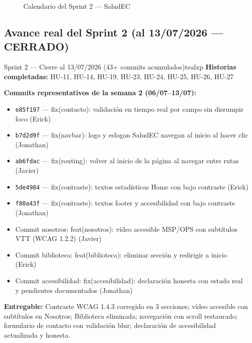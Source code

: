 \documentclass[12pt, a4paper]{article}
\begin{document}
\begin{figure}[H]
\caption{Calendario del Sprint 2 --- SaludEC}
\end{figure}

\subsection{Avance real del Sprint 2 (al 13/07/2026 --- CERRADO)}

\begin{iterbox}{Sprint 2 --- Cierre al 13/07/2026 (43+ commits acumulados)}{tealxp}
\textbf{Historias completadas:} HU-11, HU-14, HU-19, HU-23, HU-24, HU-25, HU-26, HU-27

\textbf{Commits representativos de la semana 2 (06/07--13/07):}
\begin{itemize}
  \item \texttt{e85f197} --- fix(contacto): validación en tiempo real por campo sin disrumpir foco (Erick)
  \item \texttt{b7d2d9f} --- fix(navbar): logo y eslogan SaludEC navegan al inicio al hacer clic (Jonathan)
  \item \texttt{ab6fdac} --- fix(routing): volver al inicio de la página al navegar entre rutas (Javier)
  \item \texttt{5de4984} --- fix(contraste): textos estadísticas Home con bajo contraste (Erick)
  \item \texttt{f80a43f} --- fix(contraste): textos footer y accesibilidad con bajo contraste (Jonathan)
  \item Commit nosotros: feat(nosotros): vídeo accesible MSP/OPS con subtítulos VTT (WCAG 1.2.2) (Javier)
  \item Commit biblioteca: feat(biblioteca): eliminar sección y redirigir a inicio (Erick)
  \item Commit accesibilidad: fix(accesibilidad): declaración honesta con estado real y pendientes documentados (Jonathan)
\end{itemize}

\textbf{Entregable:} Contraste WCAG 1.4.3 corregido en 3 secciones; vídeo accesible con subtítulos en Nosotros; Biblioteca eliminada; navegación con scroll restaurado; formulario de contacto con validación blur; declaración de accesibilidad actualizada y honesta.
\end{iterbox}
\end{document}
